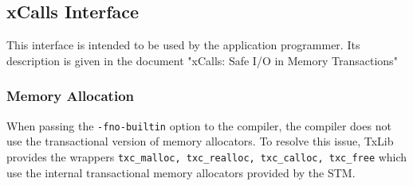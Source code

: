 \subsection{xCalls Interface}

This interface is intended to be used by the application programmer.
Its description is given in the document "xCalls: Safe I/O in Memory Transactions"

\subsubsection{Memory Allocation}
When passing the {\tt -fno-builtin} option to the compiler, the compiler does not use
the transactional version of memory allocators. To resolve this issue, TxLib provides 
the wrappers {\tt txc\_malloc, txc\_realloc, txc\_calloc, txc\_free} which use 
the internal transactional memory allocators provided by the STM. 
